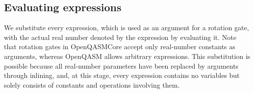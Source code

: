 \subsection{Evaluating expressions}
\label{ch:openqasm:desugaring:expr}

\noindent
We substitute every expression, which is used as an argument for a rotation
gate, with the actual real number denoted by the expression by evaluating it.
%
Note that rotation gates in OpenQASMCore accept only real-number constants as
arguments, whereas OpenQASM allows arbitrary expressions.
%
This substitution is possible because all real-number parameters have been
replaced by arguments through inlining, and, at this stage, every expression
contains no variables but solely consists of constants and operations involving
them.

